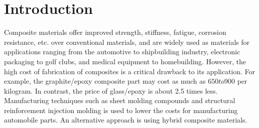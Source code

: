 \documentclass[USenglish,twocolumn]{article}
\begin{document}
\section{Introduction}
Composite materials offer improved strength, stiffness, fatigue, corrosion resistance, etc. over
conventional materials, and are widely used as materials for applications ranging from the automotive to shipbuilding
industry, electronic packaging to golf clubs, and medical equipment to homebuilding. However, the high
cost of fabrication of composites is a critical drawback to its application. For example, the
graphite/epoxy composite part may cost as much as $650 to $900 per kilogram. In contrast, the price
of glass/epoxy is about 2.5 times less. Manufacturing techniques such as sheet molding compounds and
structural reinforcement injection molding is used to lower the  costs for manufacturing automobile parts.
An alternative approach is using hybrid composite materials.
\end{document}
